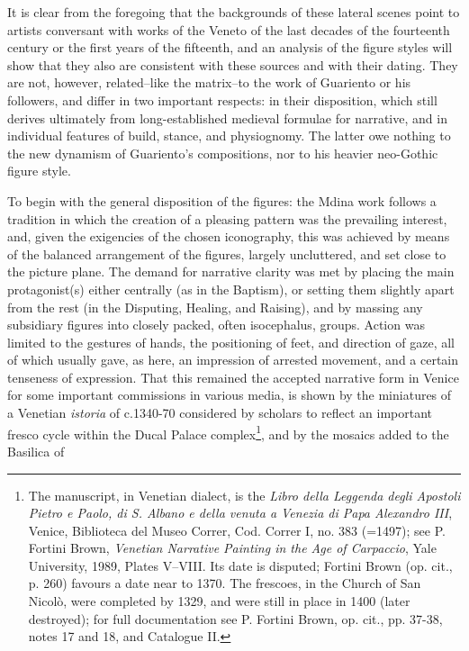 \documentclass[a4paper,12pt]{article}
\begin{document}
It is clear from the foregoing that the backgrounds of these lateral
scenes point to artists conversant with works of the Veneto of the
last decades of the fourteenth century or the first years of the
fifteenth, and an analysis of the figure styles will show that they
also are consistent with these sources and with their dating. They are
not, however, related--like the matrix--to the work of Guariento or
his followers, and differ in two important respects: in their
disposition, which still derives ultimately from long-established
medieval formulae for narrative, and in individual features of build,
stance, and physiognomy. The latter owe nothing to the new dynamism of
Guariento's compositions, nor to his heavier neo-Gothic figure style.

To begin with the general disposition of the figures: the Mdina work
follows a tradition in which the creation of a pleasing pattern was
the prevailing interest, and, given the exigencies of the chosen
iconography, this was achieved by means of the balanced arrangement of
the figures, largely uncluttered, and set close to the picture
plane. The demand for narrative clarity was met by placing the main
protagonist(s) either centrally (as in the Baptism), or setting them
slightly apart from the rest (in the Disputing, Healing, and Raising),
and by massing any subsidiary figures into closely packed, often
isocephalus, groups.  Action was limited to the gestures of hands, the
positioning of feet, and direction of gaze, all of which usually gave,
as here, an impression of arrested movement, and a certain tenseness
of expression.  That this remained the accepted narrative form in
Venice for some important commissions in various media, is shown by
the miniatures of a Venetian \textit{istoria} of c.1340-70 considered
by scholars to reflect an important fresco cycle within the Ducal
Palace complex\footnote{The manuscript, in Venetian dialect, is the
\textit{Libro della Leggenda degli Apostoli Pietro e Paolo, di
S. Albano e della venuta a Venezia di Papa Alexandro III}, Venice,
Biblioteca del Museo Correr, Cod. Correr I, no. 383 (=1497); see
P. Fortini Brown, \textit{Venetian Narrative Painting in the Age of
Carpaccio}, Yale University, 1989, Plates V--VIII. Its date is
disputed; Fortini Brown (op. cit., p. 260) favours a date near to
1370.  The frescoes, in the Church of San Nicol\`o, were completed by
1329, and were still in place in 1400 (later destroyed); for full
documentation see P. Fortini Brown, op. cit., pp. 37-38, notes 17 and
18, and Catalogue II.}, and by the mosaics added to the Basilica of
\end{document}
